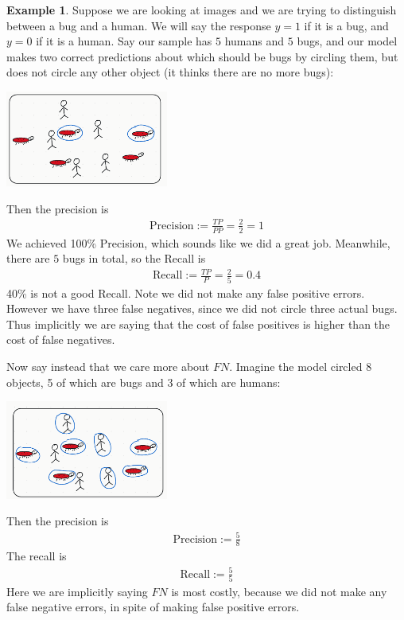 \documentclass[12pt, a4paper]{article}
\theoremstyle{definition}
\newtheorem*{example}{Example}
\begin{document}
	\begin{tcolorbox}[breakable]
		\begin{example}
			Suppose we are looking at images and we are trying to distinguish
			between a bug and a human. We will say the response $y = 1$
			if it is a bug, and $y=0$ if it is a human. Say our sample
			has $5$ humans and $5$ bugs, and our model makes two correct predictions
			about which should be bugs by circling them, but does not circle
			any other object (it thinks there are no more bugs):
			\begin{center}
				\includegraphics[width=0.4\textwidth]{perfect-precision-2-bugs}
			\end{center}
			Then the precision is
			\begin{align*}
				\text{Precision} := \frac{TP}{PP} = \frac{2}{2} = 1
			\end{align*}
			We achieved 100\% Precision, which sounds like we did a great job.
			Meanwhile, there are $5$ bugs in total, so the Recall is
			\begin{align*}
				\text{Recall} := \frac{TP}{P} = \frac{2}{5} = 0.4
			\end{align*}
			40\% is not a good Recall. Note we did not make any false positive
			errors. However we have three false negatives, since we did not
			circle three actual bugs. Thus implicitly we are saying that
			the cost of false positives is higher than the cost of false negatives.
			
			Now say instead that we care more about $FN$. Imagine the model
			circled 8 objects, 5 of which are bugs and 3 of which are humans:
			\begin{center}
				\includegraphics[width=0.4\textwidth]{perfect-recall-5-bugs-3-humans}
			\end{center}
			Then the precision is
			\begin{align*}
				\text{Precision} := \frac{5}{8}
			\end{align*}
			The recall is
			\begin{align*}
				\text{Recall} := \frac{5}{5}
			\end{align*}
			Here we are implicitly saying $FN$ is most costly, because we did
			not make any false negative errors, in spite of making false positive
			errors.
		\end{example}
	\end{tcolorbox}
\end{document}
